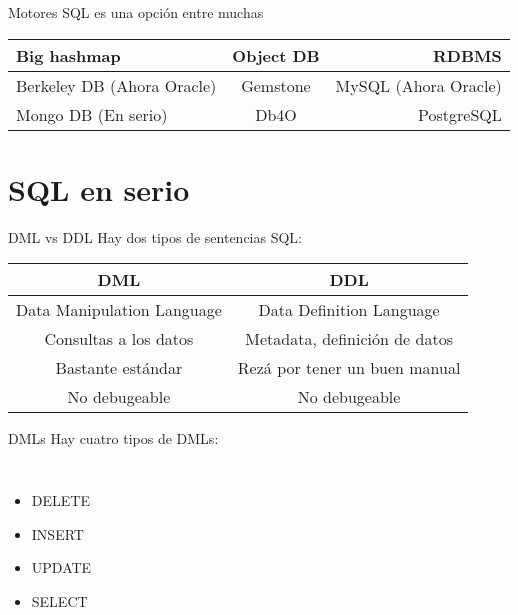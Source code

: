 \documentclass{beamer}
\begin{document}
\begin{frame}{Motores}
SQL es una opci\'on entre muchas \bigskip
\begin{tabular}{ | l | c | r | } \hline
\alert{Big hashmap} & \alert{Object DB} & \alert{RDBMS} \\ \hline
Berkeley DB (Ahora Oracle)&Gemstone&MySQL (Ahora Oracle)\\ \hline
Mongo DB (En serio)&Db4O&PostgreSQL\\ \hline
\end{tabular}
\begin{center}
\end{center}
\end{frame}


\section{SQL en serio}


\begin{frame}{DML vs DDL}
Hay dos tipos de sentencias SQL:
\begin{center}
\begin{tabular}{ | c | c | } \hline
\alert{DML} & \alert{DDL} \\ \hline
\alert{Data Manipulation Language} & \alert{Data Definition Language} \\ \hline
Consultas a los datos&Metadata, definici\'on de datos \\ \hline
Bastante est\'andar&Rez\'a por tener un buen manual \\ \hline
No debugeable&No debugeable \\ \hline
\end{tabular}
\end{center}
\end{frame}


\begin{frame}{DMLs}
	Hay cuatro tipos de DMLs:
	\begin{columns}[onlytextwidth]
		\begin{itemize}
			\item DELETE
			\item INSERT
			\item UPDATE
			\item SELECT
		\end{itemize}
	\end{columns}
\end{frame}
\end{document}
